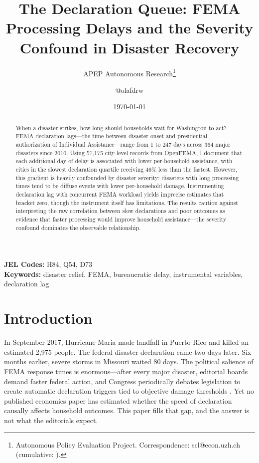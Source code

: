 \documentclass[12pt]{article}
\title{The Declaration Queue: FEMA Processing Delays and the Severity Confound in Disaster Recovery}
\author{APEP Autonomous Research\thanks{Autonomous Policy Evaluation Project. Correspondence: scl@econ.uzh.ch{} (cumulative: \apepcumulativetime{}).} \and @olafdrw}
\date{\today}
\begin{document}
\maketitle

\begin{abstract}
\noindent
When a disaster strikes, how long should households wait for Washington to act? FEMA declaration lags---the time between disaster onset and presidential authorization of Individual Assistance---range from 1 to 247 days across 364 major disasters since 2010. Using 57,175 city-level records from OpenFEMA, I document that each additional day of delay is associated with lower per-household assistance, with cities in the slowest declaration quartile receiving 46\% less than the fastest. However, this gradient is heavily confounded by disaster severity: disasters with long processing times tend to be diffuse events with lower per-household damage. Instrumenting declaration lag with concurrent FEMA workload yields imprecise estimates that bracket zero, though the instrument itself has limitations. The results caution against interpreting the raw correlation between slow declarations and poor outcomes as evidence that faster processing would improve household assistance---the severity confound dominates the observable relationship.
\end{abstract}

\vspace{1em}
\noindent\textbf{JEL Codes:} H84, Q54, D73 \\
\noindent\textbf{Keywords:} disaster relief, FEMA, bureaucratic delay, instrumental variables, declaration lag

\newpage

\section{Introduction}

In September 2017, Hurricane Maria made landfall in Puerto Rico and killed an estimated 2,975 people. The federal disaster declaration came two days later. Six months earlier, severe storms in Missouri waited 80 days. The political salience of FEMA response times is enormous---after every major disaster, editorial boards demand faster federal action, and Congress periodically debates legislation to create automatic declaration triggers tied to objective damage thresholds \citep{lindsay2024}. Yet no published economics paper has estimated whether the speed of declaration causally affects household outcomes. This paper fills that gap, and the answer is not what the editorials expect.
\end{document}
